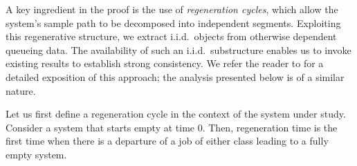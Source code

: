 \documentclass[11pt]{article}
\newcommand{\jp}[1]{\footnote{J-P: #1}}
\theoremstyle{remark}
\theoremstyle{definition}
\numberwithin{equation}{section}
\begin{document}
A key ingredient in the proof is the use of \emph{regeneration cycles}, which allow the system’s sample path to be decomposed into independent segments. Exploiting this regenerative structure, we extract i.i.d.\ objects from otherwise dependent queueing data. The availability of such an i.i.d.\ substructure enables us to invoke existing results to establish strong consistency. We refer the reader to \cite{bodas2023} for a detailed exposition of this approach; the analysis presented below is of a similar nature. 

Let us first define a regeneration cycle in the context of the system under study.
Consider a system that starts empty at time 0.
Then, regeneration time is the first time when there is a departure of a job of either class leading to a fully empty system.
\end{document}
